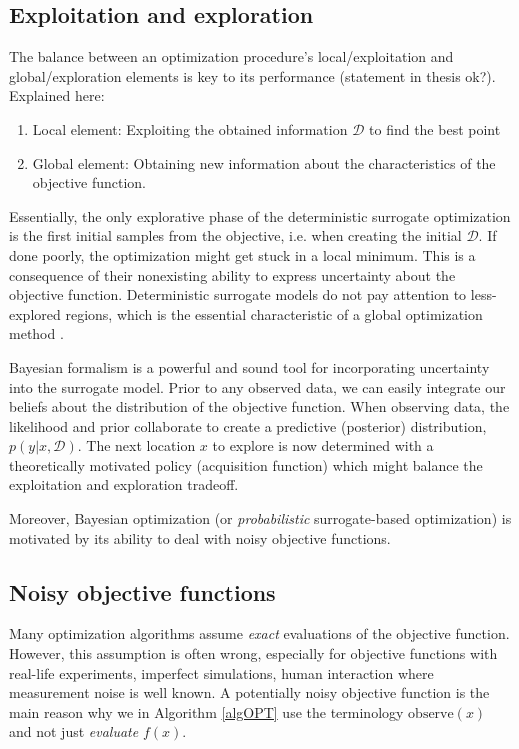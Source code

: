 \subsection{Exploitation and exploration}
The balance between an optimization procedure's local/exploitation and global/exploration elements
is key to its performance (statement in thesis \cite{PhDthesis} ok?). Explained here:
\begin{enumerate}
    \item Local element: Exploiting the obtained information $\mathcal{D}$ to find the best point
    \item Global element: Obtaining new information about the characteristics of the objective
    function.
\end{enumerate}
Essentially, the only explorative phase of the deterministic surrogate optimization is the first
initial samples from the objective, i.e. when creating the initial $\mathcal{D}$. If done poorly,
the optimization might get stuck in a local minimum. This is a consequence of their nonexisting
ability to express uncertainty about the objective function. Deterministic surrogate models do not
pay attention to less-explored regions, which is the essential characteristic of a global
optimization method \cite{GlobalOptimization}. 

Bayesian formalism is a powerful and sound tool for incorporating uncertainty into the surrogate
model. Prior to any observed data, we can easily integrate our beliefs about the distribution of
the objective function. When observing data, the likelihood and prior collaborate to create a
predictive (posterior) distribution, $p(y|x,\mathcal{D})$. The next location $x$ to explore is now
determined with a theoretically motivated policy (acquisition function) which might balance the
exploitation and exploration tradeoff. 

Moreover, Bayesian optimization (or \textit{probabilistic} surrogate-based optimization) is motivated by
its ability to deal with noisy objective functions. 


\subsection{Noisy objective functions}
Many optimization algorithms assume \textit{exact} evaluations of the objective function. However,
this assumption is often wrong, especially for objective functions with real-life experiments,
imperfect simulations, human interaction where measurement noise is well known. A potentially noisy
objective function is the main reason why we in Algorithm \eqref{algOPT} use the terminology
$\text{observe}(x)$ and not just \textit{evaluate }$f(x)$.

